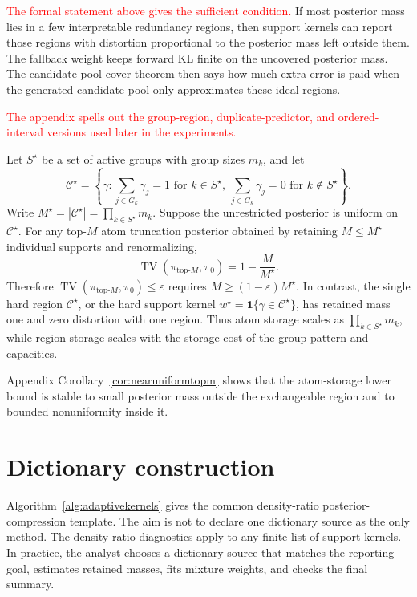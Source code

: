 \documentclass[twoside,11pt]{article}
\newcommand{\ind}{\mathbf{1}}
\newcommand{\TV}{\operatorname{TV}}
\newcommand{\rev}[1]{\textcolor{red}{#1}}
\begin{document}
\rev{The formal statement above gives the sufficient condition.} If most posterior mass lies in a few interpretable redundancy regions, then support kernels can report those regions with distortion proportional to the posterior mass left outside them. The fallback weight keeps forward KL finite on the uncovered posterior mass. The candidate-pool cover theorem then says how much extra error is paid when the generated candidate pool only approximates these ideal regions.

\rev{The appendix spells out the group-region, duplicate-predictor, and ordered-interval versions used later in the experiments.}

\begin{theorem}
\label{thm:topmseparation}
Let $S^\star$ be a set of active groups with group sizes $m_k$, and let
\[
\mathcal C^\star=\left\{\gamma:\sum_{j\in G_k}\gamma_j=1 \text{ for } k\in S^\star,\ \sum_{j\in G_k}\gamma_j=0 \text{ for } k\notin S^\star\right\}.
\]
Write $M^\star=|\mathcal C^\star|=\prod_{k\in S^\star}m_k$. Suppose the unrestricted posterior is uniform on $\mathcal C^\star$. For any top-$M$ atom truncation posterior obtained by retaining $M\le M^\star$ individual supports and renormalizing,
\[
\TV(\pi_{\mathrm{top}\text{-}M},\pi_0) = 1-\frac{M}{M^\star}.
\]
Therefore \(\TV(\pi_{\mathrm{top}\text{-}M},\pi_0)\le\varepsilon\) requires \(M\ge(1-\varepsilon)M^\star\). In contrast, the single hard region \(\mathcal C^\star\), or the hard support kernel \(w^\star=\ind\{\gamma\in\mathcal C^\star\}\), has retained mass one and zero distortion with one region. Thus atom storage scales as \(\prod_{k\in S^\star}m_k\), while region storage scales with the storage cost of the group pattern and capacities.
\end{theorem}

Appendix Corollary~\ref{cor:nearuniformtopm} shows that the atom-storage lower bound is stable to small posterior mass outside the exchangeable region and to bounded nonuniformity inside it.

\section{Dictionary construction}
\label{sec:mainalgorithms}

Algorithm~\ref{alg:adaptivekernels} gives the common density-ratio posterior-compression template. The aim is not to declare one dictionary source as the only method. The density-ratio diagnostics apply to any finite list of support kernels. In practice, the analyst chooses a dictionary source that matches the reporting goal, estimates retained masses, fits mixture weights, and checks the final summary.
\end{document}
